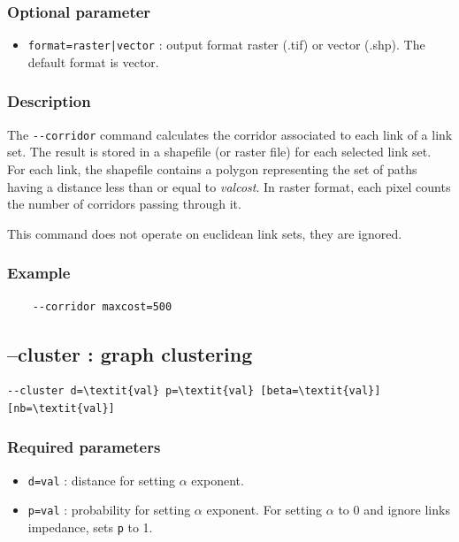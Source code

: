 \documentclass[a4paper,10pt]{report}
\begin{document}
\subsubsection{Optional parameter}
\begin{itemize}
	\item \verb+format=raster|vector+ : output format raster (.tif) or vector (.shp). The default format is vector.
\end{itemize}

\subsubsection{Description}
The \verb|--corridor| command calculates the corridor associated to each link of a link set.
The result is stored in a shapefile (or raster file) for each selected link set.
For each link, the shapefile contains a polygon representing the set of paths having a distance less than or equal to \textit{valcost}. In raster format, each pixel counts the number of corridors passing through it.

This command does not operate on euclidean link sets, they are ignored.

\subsubsection{Example}
\begin{Verbatim}
	--corridor maxcost=500
\end{Verbatim}

\subsection{--cluster : graph clustering}
\begin{Verbatim}[commandchars=\\\{\}]
--cluster d=\textit{val} p=\textit{val} [beta=\textit{val}] [nb=\textit{val}]
\end{Verbatim}

\subsubsection{Required parameters}
\begin{itemize}
	\item \verb|d=val| : distance for setting $\alpha$ exponent.
	\item \verb|p=val| : probability for setting $\alpha$ exponent. For setting $\alpha$ to 0 and ignore links impedance, sets \verb|p| to 1.
\end{itemize}
\end{document}
